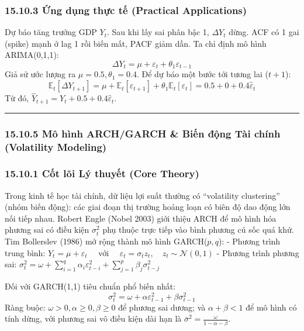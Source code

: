 \documentclass[
]{article}
\begin{document}
\subsubsection{15.10.3 Ứng dụng thực tế (Practical
Applications)}\label{ux1ee9ng-dux1ee5ng-thux1ef1c-tux1ebf-practical-applications-65}

Dự báo tăng trưởng GDP \(Y_t\). Sau khi lấy sai phân bậc 1,
\(\Delta Y_t\) dừng. ACF có 1 gai (spike) mạnh ở lag 1 rồi biến mất,
PACF giảm dần. Ta chỉ định mô hình ARIMA(0,1,1):
\[ \Delta Y_t = \mu + \varepsilon_t + \theta_1 \varepsilon_{t-1} \] Giả
sử ước lượng ra \(\mu = 0.5, \theta_1 = 0.4\). Để dự báo một bước tới
tương lai (\(t+1\)):
\[ \mathbb{E}_t[\Delta Y_{t+1}] = \mu + \mathbb{E}_t[\varepsilon_{t+1}] + \theta_1 \mathbb{E}_t[\varepsilon_t] = 0.5 + 0 + 0.4 \hat{\varepsilon}_t \]
Từ đó, \(\hat{Y}_{t+1} = Y_t + 0.5 + 0.4 \hat{\varepsilon}_t\).

\begin{center}\rule{0.5\linewidth}{0.5pt}\end{center}

\subsubsection{15.10.5 Mô hình ARCH/GARCH \& Biến động Tài chính
(Volatility
Modeling)}\label{muxf4-huxecnh-archgarch-biux1ebfn-ux111ux1ed9ng-tuxe0i-chuxednh-volatility-modeling}

\subsubsection{15.10.1 Cốt lõi Lý thuyết (Core
Theory)}\label{cux1ed1t-luxf5i-luxfd-thuyux1ebft-core-theory-59}

Trong kinh tế học tài chính, dữ liệu lợi suất thường có ``volatility
clustering'' (nhóm biến động): các giai đoạn thị trường hoảng loạn có
biên độ dao động lớn nối tiếp nhau. Robert Engle (Nobel 2003) giới thiệu
ARCH để mô hình hóa phương sai có điều kiện \(\sigma_t^2\) phụ thuộc
trực tiếp vào bình phương cú sốc quá khứ. Tim Bollerslev (1986) mở rộng
thành mô hình GARCH(\(p, q\)): - Phương trình trung bình:
\(Y_t = \mu + \varepsilon_t \quad\) với
\(\quad \varepsilon_t = \sigma_t z_t, \quad z_t \sim \mathcal{N}(0,1)\)
- Phương trình phương sai:
\(\sigma_t^2 = \omega + \sum_{i=1}^q \alpha_i \varepsilon_{t-i}^2 + \sum_{j=1}^p \beta_j \sigma_{t-j}^2\)

Đối với GARCH(1,1) tiêu chuẩn phổ biến nhất:
\[ \sigma_t^2 = \omega + \alpha \varepsilon_{t-1}^2 + \beta \sigma_{t-1}^2 \]
Ràng buộc: \(\omega > 0, \alpha \ge 0, \beta \ge 0\) để phương sai
dương; và \(\alpha + \beta < 1\) để mô hình có tính dừng, với phương sai
vô điều kiện dài hạn là
\(\bar{\sigma}^2 = \frac{\omega}{1 - \alpha - \beta}\).
\end{document}
